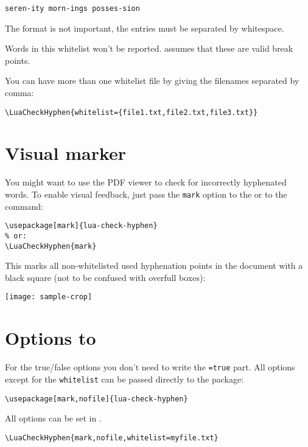 \documentclass{ltxdockit}
\begin{document}
\begin{verbatim}
seren-ity morn-ings posses-sion
\end{verbatim}

The format is not important, the entries must be separated by whitespace.

Words in this whitelist won't be reported.  assumes that these are valid break points.

You can have more than one whitelist file by giving the filenames separated by comma:

\begin{verbatim}
\LuaCheckHyphen{whitelist={file1.txt,file2.txt,file3.txt}}
\end{verbatim}

\section{Visual marker}

You might want to use the PDF viewer to check for incorrectly hyphenated words. To enable visual feedback, just pass the \texttt{mark} option to the  or to the  command:

\begin{verbatim}
\usepackage[mark]{lua-check-hyphen}
% or:
\LuaCheckHyphen{mark}
\end{verbatim}

This marks all non-whitelisted used hyphenation points in the document with a black square (not to be confused with overfull boxes): 

\texttt{[image: sample-crop]}

\section{Options to }

For the true/false options you don't need to write the \texttt{=true} part. All options except for the \texttt{whitelist} can be passed directly to the package:

\begin{verbatim}
\usepackage[mark,nofile]{lua-check-hyphen}
\end{verbatim}

\noindent All options can be set in .

\begin{verbatim}
\LuaCheckHyphen{mark,nofile,whitelist=myfile.txt}
\end{verbatim}
\end{document}
